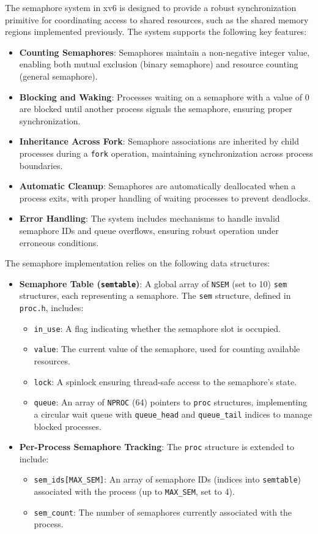 \documentclass[12pt]{article}
\begin{document}
The semaphore system in xv6 is designed to provide a robust synchronization primitive for coordinating access to shared resources, such as the shared memory regions implemented previously. The system supports the following key features:
\begin{itemize}
  \item \textbf{Counting Semaphores}: Semaphores maintain a non-negative integer value, enabling both mutual exclusion (binary semaphore) and resource counting (general semaphore).
  \item \textbf{Blocking and Waking}: Processes waiting on a semaphore with a value of 0 are blocked until another process signals the semaphore, ensuring proper synchronization.
  \item \textbf{Inheritance Across Fork}: Semaphore associations are inherited by child processes during a \texttt{fork} operation, maintaining synchronization across process boundaries.
  \item \textbf{Automatic Cleanup}: Semaphores are automatically deallocated when a process exits, with proper handling of waiting processes to prevent deadlocks.
  \item \textbf{Error Handling}: The system includes mechanisms to handle invalid semaphore IDs and queue overflows, ensuring robust operation under erroneous conditions.
\end{itemize}

The semaphore implementation relies on the following data structures:
\begin{itemize}
  \item \textbf{Semaphore Table (\texttt{semtable})}: A global array of \texttt{NSEM} (set to 10) \texttt{sem} structures, each representing a semaphore. The \texttt{sem} structure, defined in \texttt{proc.h}, includes:
    \begin{itemize}
      \item \texttt{in\_use}: A flag indicating whether the semaphore slot is occupied.
      \item \texttt{value}: The current value of the semaphore, used for counting available resources.
      \item \texttt{lock}: A spinlock ensuring thread-safe access to the semaphore’s state.
      \item \texttt{queue}: An array of \texttt{NPROC} (64) pointers to \texttt{proc} structures, implementing a circular wait queue with \texttt{queue\_head} and \texttt{queue\_tail} indices to manage blocked processes.
    \end{itemize}
  \item \textbf{Per-Process Semaphore Tracking}: The \texttt{proc} structure is extended to include:
    \begin{itemize}
      \item \texttt{sem\_ids[MAX\_SEM]}: An array of semaphore IDs (indices into \texttt{semtable}) associated with the process (up to \texttt{MAX\_SEM}, set to 4).
      \item \texttt{sem\_count}: The number of semaphores currently associated with the process.
    \end{itemize}
\end{itemize}
\end{document}
